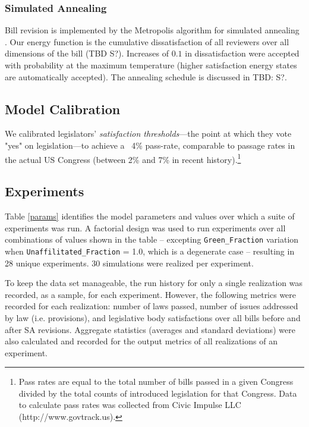 \documentclass[pdftex,12pt,oribibl]{llncs}
\begin{document}
\subsubsection{Simulated Annealing}
Bill revision is implemented by the Metropolis algorithm for simulated annealing \parencite{mrrt53, kgv}.
Our energy function is the cumulative dissatisfaction of all reviewers over all dimensions of the bill (TBD S?). Increases of $0.1$ in dissatisfaction were accepted with probability  at the maximum temperature (higher satisfaction energy states are automatically accepted).
The annealing schedule is discussed in TBD: S?.
\subsection{Model Calibration}
We calibrated legislators' \textit{satisfaction thresholds}---the point at which they vote "yes" on legislation---to achieve a ~4\% pass-rate, comparable to passage rates in the actual US Congress (between 2\% and 7\% in recent history).\footnote{Pass rates are equal to the total number of bills passed in a given Congress divided by the total counts of introduced legislation for that Congress. Data to calculate pass rates was collected from Civic Impulse LLC (http://www.govtrack.us).\label{passfn}}
\subsection{Experiments}
Table \ref{params} identifies the model parameters and values over which a suite of experiments was run.
A factorial design was used to run experiments over all combinations of values shown in the table -- excepting \texttt{Green\_Fraction} variation when {\texttt{Unaffilitated\_Fraction} = 1.0}, which is a degenerate case -- resulting in 28 unique experiments.
30 simulations were realized per experiment.

To keep the data set manageable, the run history for only a single realization was recorded, as a sample, for each experiment.
However, the following metrics were recorded for each realization: number of laws passed, number of issues addressed by law (i.e. provisions), and legislative body satisfactions over all bills before and after SA revisions.
Aggregate statistics (averages and standard deviations) were also calculated and recorded for the output metrics of all realizations of an experiment.
\end{document}
